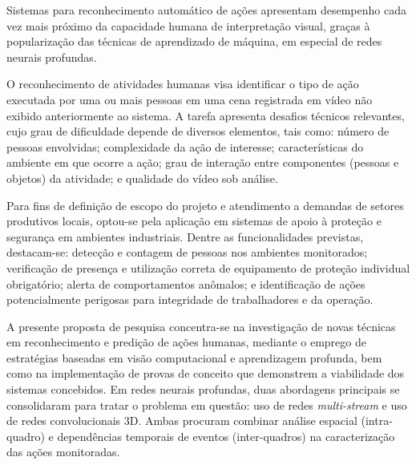 %
%
% 
Sistemas para reconhecimento automático de ações apresentam desempenho cada vez mais próximo da capacidade humana de interpretação visual, graças à popularização das técnicas de aprendizado de máquina, em especial de redes neurais profundas. 
%

O reconhecimento de atividades humanas visa identificar o tipo de ação executada por uma ou mais pessoas em uma cena registrada em vídeo não exibido anteriormente ao sistema.
%
A tarefa apresenta desafios técnicos relevantes, cujo grau de dificuldade depende de diversos elementos, tais como: número de pessoas envolvidas; complexidade da ação de interesse; características do ambiente em que ocorre a ação; grau de interação entre componentes (pessoas e objetos) da atividade; e qualidade do vídeo sob análise. 
%

Para fins de definição de escopo do projeto e atendimento a demandas de setores produtivos locais, optou-se pela aplicação em sistemas de apoio à proteção e segurança em ambientes industriais. Dentre as funcionalidades previstas, destacam-se: detecção e contagem de pessoas nos ambientes monitorados; verificação de presença e utilização correta de equipamento de proteção individual obrigatório; alerta de comportamentos anômalos; e identificação de ações potencialmente perigosas para integridade de trabalhadores e da operação.
%

A presente proposta de pesquisa concentra-se na investigação de novas técnicas em reconhecimento e predição de ações humanas, mediante o emprego de estratégias baseadas em visão computacional e aprendizagem profunda, bem como na implementação de provas de conceito que demonstrem a viabilidade dos sistemas concebidos. 
%
Em redes neurais profundas, duas abordagens principais se consolidaram para tratar o problema em questão: uso de redes \emph{multi-stream} e uso de redes convolucionais 3D. Ambas procuram combinar análise espacial (intra-quadro) e dependências temporais de eventos (inter-quadros) na caracterização das ações monitoradas. 
%

